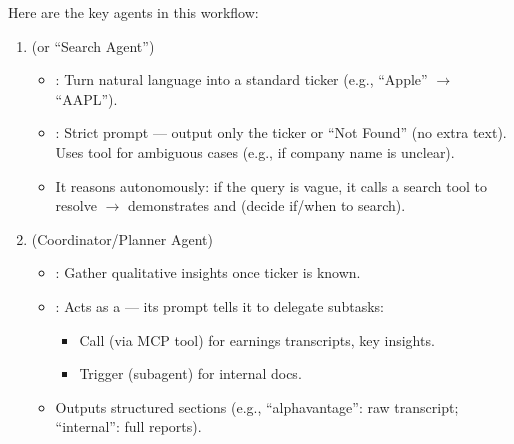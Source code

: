 \documentclass[letterpaper,10pt,english]{sphinxmanual}
\begin{document}
\sphinxAtStartPar
Here are the key agents in this workflow:
\begin{enumerate}
%
\item {} 
\sphinxAtStartPar
{} (or “Search Agent”)
\begin{itemize}
\item {} 
\sphinxAtStartPar
{}: Turn natural language into a standard ticker (e.g.,
“Apple” \(\rightarrow\) “AAPL”).

\item {} 
\sphinxAtStartPar
{}: Strict prompt — output only the ticker or “Not Found”
(no extra text). Uses  tool for ambiguous cases
(e.g., if company name is unclear).

\item {} 
\sphinxAtStartPar
{} It reasons autonomously: if the query is vague,
it calls a search tool to resolve \(\rightarrow\) demonstrates  and
 (decide if/when to search).

\end{itemize}

\item {} 
\sphinxAtStartPar
{} (Coordinator/Planner Agent)
\begin{itemize}
\item {} 
\sphinxAtStartPar
{}: Gather qualitative insights once ticker is known.

\item {} 
\sphinxAtStartPar
{}: Acts as a  — its prompt tells it to delegate
subtasks:
\begin{itemize}
\item {} 
\sphinxAtStartPar
Call  (via MCP tool) for earnings
transcripts, key insights.

\item {} 
\sphinxAtStartPar
Trigger 
(sub\sphinxhyphen{}agent) for internal docs.

\end{itemize}

\item {} 
\sphinxAtStartPar
Outputs structured sections (e.g., “alphavantage”: raw transcript;
“internal”: full reports).


\end{itemize}
\end{enumerate}
\end{document}
